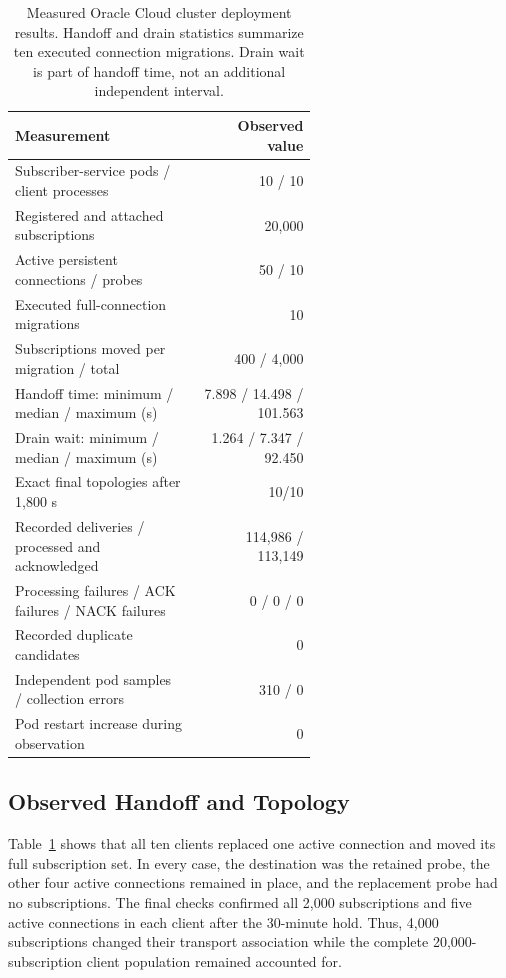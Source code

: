 \begin{table}[t]
  \caption{Measured Oracle Cloud cluster deployment results. Handoff and drain statistics
  summarize ten executed connection migrations. Drain wait is part of handoff
  time, not an additional independent interval.}
  \label{tab:mumbai-live-results}
  \centering
  \small
  \begin{tabular}{p{0.60\linewidth}r}
    \toprule
    Measurement & Observed value \\
    \midrule
    Subscriber-service pods / client processes & 10 / 10 \\
    Registered and attached subscriptions & 20,000 \\
    Active persistent connections / probes & 50 / 10 \\
    Executed full-connection migrations & 10 \\
    Subscriptions moved per migration / total & 400 / 4,000 \\
    Handoff time: minimum / median / maximum (s) & 7.898 / 14.498 / 101.563 \\
    Drain wait: minimum / median / maximum (s) & 1.264 / 7.347 / 92.450 \\
    Exact final topologies after 1,800 s & 10/10 \\
    Recorded deliveries / processed and acknowledged & 114,986 / 113,149 \\
    Processing failures / ACK failures / NACK failures & 0 / 0 / 0 \\
    Recorded duplicate candidates & 0 \\
    Independent pod samples / collection errors & 310 / 0 \\
    Pod restart increase during observation & 0 \\
    \bottomrule
  \end{tabular}
\end{table}

\subsection{Observed Handoff and Topology}

Table~\ref{tab:mumbai-live-results} shows that all ten clients replaced one
active connection and moved its full subscription set. In every case, the
destination was the retained probe, the other four active connections remained
in place, and the replacement probe had no subscriptions. The final checks
confirmed all 2,000 subscriptions and five active connections in each client
after the 30-minute hold. Thus, 4,000 subscriptions changed their transport
association while the complete 20,000-subscription client population remained
accounted for.

